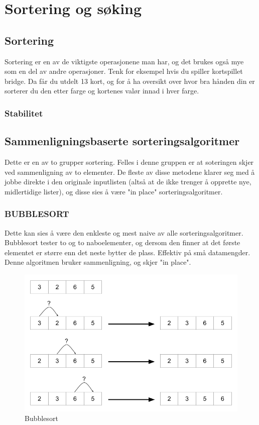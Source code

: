 \section{Sortering og søking}

\subsection{Sortering}
Sortering er en av de viktigste operasjonene man har, og det brukes også mye som en del av andre operasjoner. Tenk for eksempel hvis du spiller kortspillet bridge. Da får du utdelt 13 kort, og for å ha oversikt over hvor bra hånden din er sorterer du den etter farge og kortenes valør innad i hver farge.

\subsubsection{Stabilitet}

\subsection{Sammenligningsbaserte sorteringsalgoritmer}
Dette er en av to grupper sortering. Felles i denne gruppen er at soteringen skjer ved sammenligning av to elementer. De fleste av disse metodene klarer seg med å jobbe direkte i den originale inputlisten (altså at de ikke trenger å opprette nye, midlertidige lister), og disse sies å være "in place" sorteringsalgoritmer.

\subsubsection{BUBBLESORT}
Dette kan sies å være den enkleste og mest naive av alle sorteringsalgoritmer. Bubblesort tester to og to naboelementer, og dersom den finner at det første elementet er større enn det neste bytter de plass. Effektiv på små datamengder. Denne algoritmen bruker sammenligning, og skjer "in place".

\begin{figure}[H]
\includegraphics[scale=0.5]{images/bubblesort}
\centering %
\caption{Bubblesort}
\label{fig:bubblesort}
\end{figure}

